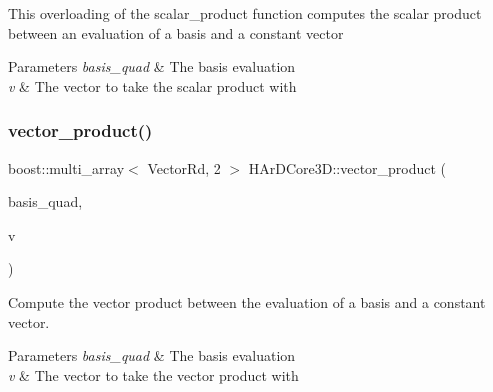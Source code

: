 This overloading of the scalar\+\_\+product function computes the scalar product between an evaluation of a basis and a constant vector 
\begin{DoxyParams}{Parameters}
{\em basis\+\_\+quad} & The basis evaluation \\
\hline
{\em v} & The vector to take the scalar product with \\
\hline
\end{DoxyParams}
\mbox{\label{group__Basis_ga7fd6906b30cba10f2f452b029a86ca00}} 
\subsubsection{\texorpdfstring{vector\+\_\+product()}{vector\_product()}}
{\footnotesize\ttfamily boost\+::multi\+\_\+array$<$ Vector\+Rd, 2 $>$ H\+Ar\+D\+Core3\+D\+::vector\+\_\+product (\begin{DoxyParamCaption}\item[{const boost\+::multi\+\_\+array$<$ Vector\+Rd, 2 $>$ \&}]{basis\+\_\+quad,  }\item[{const Vector\+Rd \&}]{v }\end{DoxyParamCaption})}



Compute the vector product between the evaluation of a basis and a constant vector. 


\begin{DoxyParams}{Parameters}
{\em basis\+\_\+quad} & The basis evaluation \\
\hline
{\em v} & The vector to take the vector product with \\
\hline
\end{DoxyParams}
